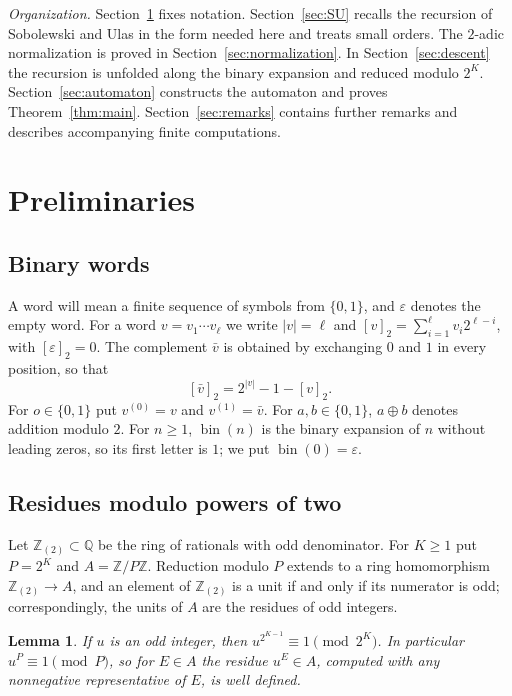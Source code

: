 \documentclass{amsart}
\newtheorem{lemma}[theorem]{Lemma}
\theoremstyle{definition}
\theoremstyle{remark}
\numberwithin{equation}{section}
\newcommand{\Z}{\mathbb{Z}}
\newcommand{\Q}{\mathbb{Q}}
\newcommand{\Zt}{\mathbb{Z}_{(2)}}
\newcommand{\val}[1]{[#1]_2}
\newcommand{\bin}{\operatorname{bin}}
\begin{document}
\emph{Organization.} Section~\ref{sec:prelim} fixes notation. Section~\ref{sec:SU} recalls the recursion of Sobolewski and Ulas in the form needed here and treats small orders. The $2$-adic normalization is proved in Section~\ref{sec:normalization}. In Section~\ref{sec:descent} the recursion is unfolded along the binary expansion and reduced modulo $2^K$. Section~\ref{sec:automaton} constructs the automaton and proves Theorem~\ref{thm:main}. Section~\ref{sec:remarks} contains further remarks and describes accompanying finite computations.

\section{Preliminaries}\label{sec:prelim}

\subsection{Binary words}
A word will mean a finite sequence of symbols from $\{0,1\}$, and $\varepsilon$ denotes the empty word. For a word $v=v_1\cdots v_\ell$ we write $|v|=\ell$ and $\val{v}=\sum_{i=1}^{\ell}v_i2^{\ell-i}$, with $\val{\varepsilon}=0$. The complement $\bar v$ is obtained by exchanging $0$ and $1$ in every position, so that
\begin{equation}\label{eq:complement}
\val{\bar v}=2^{|v|}-1-\val{v}.
\end{equation}
For $o\in\{0,1\}$ put $v^{(0)}=v$ and $v^{(1)}=\bar v$. For $a,b\in\{0,1\}$, $a\oplus b$ denotes addition modulo $2$. For $n\ge1$, $\bin(n)$ is the binary expansion of $n$ without leading zeros, so its first letter is $1$; we put $\bin(0)=\varepsilon$.

\subsection{Residues modulo powers of two}
Let $\Zt\subset\Q$ be the ring of rationals with odd denominator. For $K\ge1$ put $P=2^K$ and $A=\Z/P\Z$. Reduction modulo $P$ extends to a ring homomorphism $\Zt\to A$, and an element of $\Zt$ is a unit if and only if its numerator is odd; correspondingly, the units of $A$ are the residues of odd integers.

\begin{lemma}\label{lem:units}
If $u$ is an odd integer, then $u^{2^{K-1}}\equiv1\pmod{2^K}$. In particular $u^P\equiv1\pmod P$, so for $E\in A$ the residue $u^E\in A$, computed with any nonnegative representative of $E$, is well defined.
\end{lemma}
\end{document}
